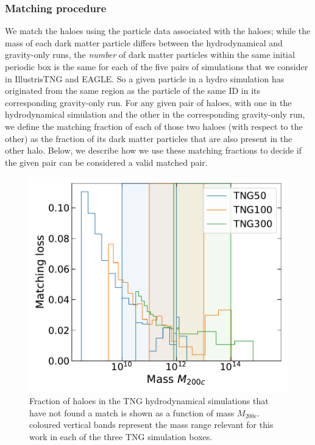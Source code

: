 \subsubsection{Matching procedure}
We match the haloes using the particle data associated with the haloes;
while the mass of each dark matter particle differs between the hydrodynamical and gravity-only runs, the \emph{number} of dark matter particles within the same initial periodic box is the same for each of the five pairs of simulations that we consider in IllustrisTNG and EAGLE. So a given particle in a hydro simulation has originated from the same region as the particle of the same ID in its corresponding gravity-only run.
For any given pair of haloes, with one in the hydrodynamical simulation and the other in the corresponding gravity-only run, we define the matching fraction of each of those two haloes (with respect to the other) 
as the fraction of its dark matter particles that are also present in the other halo. Below, we describe how we use 
these matching fractions to decide if the given pair can be considered a valid matched pair. 


\begin{figure}
    \centering
    \includegraphics[width=\linewidth]{plots/hal_match_efficiency_mass_all.pdf}
    \caption{Fraction of haloes in the TNG hydrodynamical simulations that have not found a match is shown as a function of mass $M_{200c}$. coloured vertical bands represent the mass range relevant for this work in each of the three TNG simulation boxes.}
    \label{fig:matching-loss-all-ch:z0main}
\end{figure}

